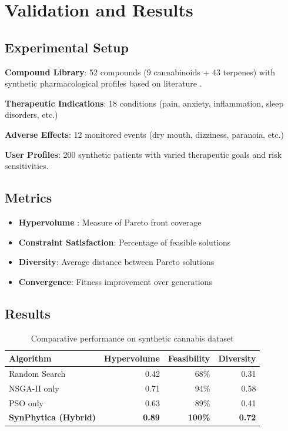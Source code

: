 \documentclass[12pt, a4paper]{article}
\begin{document}
\section{Validation and Results}

\subsection{Experimental Setup}

\textbf{Compound Library}: 52 compounds (9 cannabinoids + 43 terpenes) with synthetic pharmacological profiles based on literature \citep{Russo2011, Ferber2020, Efflux2020}.

\textbf{Therapeutic Indications}: 18 conditions (pain, anxiety, inflammation, sleep disorders, etc.)

\textbf{Adverse Effects}: 12 monitored events (dry mouth, dizziness, paranoia, etc.)

\textbf{User Profiles}: 200 synthetic patients with varied therapeutic goals and risk sensitivities.

\subsection{Metrics}

\begin{itemize}
    \item \textbf{Hypervolume} \citep{Deb2002}: Measure of Pareto front coverage
    \item \textbf{Constraint Satisfaction}: Percentage of feasible solutions
    \item \textbf{Diversity}: Average distance between Pareto solutions
    \item \textbf{Convergence}: Fitness improvement over generations
\end{itemize}

\subsection{Results}

\begin{table}[h]
\centering
\begin{tabular}{lrrr}
\toprule
\textbf{Algorithm} & \textbf{Hypervolume} & \textbf{Feasibility} & \textbf{Diversity} \\
\midrule
Random Search & 0.42 & 68\% & 0.31 \\
NSGA-II only & 0.71 & 94\% & 0.58 \\
PSO only & 0.63 & 89\% & 0.41 \\
\textbf{SynPhytica (Hybrid)} & \textbf{0.89} & \textbf{100\%} & \textbf{0.72} \\
\bottomrule
\end{tabular}
\caption{Comparative performance on synthetic cannabis dataset}
\end{table}
\end{document}
